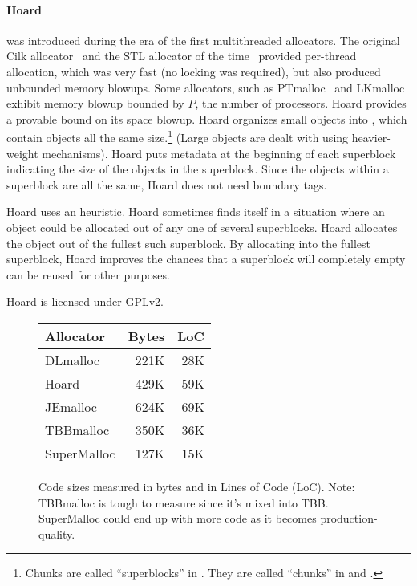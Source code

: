 \documentclass[pldi]{sigplanconf-pldi15}
\begin{document}
{\paragraph{Hoard}} \cite{BergerMcBl00} was introduced during the era
of the first multithreaded allocators.  The original Cilk
allocator~\cite{BlumofeLe94} and the STL allocator of the
time~\cite{SGI97} provided per-thread allocation, which was very fast
(no locking was required), but also produced unbounded memory blowups.
Some allocators, such as PTmalloc~\cite{Gloger06} and
LKmalloc~\cite{LarsonKr98} exhibit memory blowup bounded by $P$, the
number of processors.  Hoard provides a provable bound on its space
blowup.  Hoard organizes small objects into , which
contain objects all the same size.\footnote{Chunks are called
  ``superblocks'' in \cite{BergerMcBl00}.  They are called ``chunks''
  in \cite{Evans06} and \cite{KukanovVo07}.}  (Large objects are dealt
with using heavier-weight mechanisms).  Hoard puts metadata at the
beginning of each superblock indicating the size of the objects in the
superblock.  Since the objects within a superblock are all the same,
Hoard does not need boundary tags.

Hoard uses an  heuristic.  Hoard sometimes
finds itself in a situation where an object could be allocated out of
any one of several superblocks.  Hoard allocates the object out of the
fullest such superblock. By allocating into the fullest superblock,
Hoard improves the chances that a superblock will completely empty can
be reused for other purposes.

Hoard is licensed under GPLv2.

\begin{figure}
\begin{tabular}{lrr}
Allocator & Bytes        & LoC \\ \hline
 DLmalloc    \cite{Lea96}        & 221K & 28K \\
 Hoard       \cite{BergerMcBl00} & 429K & 59K \\
 JEmalloc    \cite{Evans06}      & 624K & 69K \\
 TBBmalloc   \cite{KukanovVo07}  & 350K & 36K \\
 SuperMalloc & 127K & 15K \\
\end{tabular}
\caption{Code sizes measured in bytes and in Lines of Code (LoC).
  Note: TBBmalloc is tough to measure since it's mixed into TBB.
  SuperMalloc could end up with more code as it becomes
  production-quality.}
\label{fig:codesize}
\end{figure}
\end{document}
